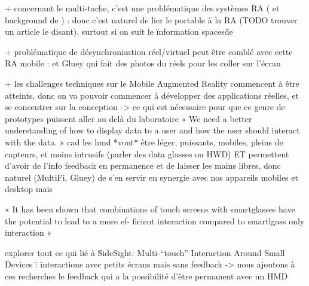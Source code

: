 + concernant le multi-tache, c'est une problématique des systèmes RA (\cite{SchmalstiegFuhrmannHesinaEtAl2002} et background de \cite{EnsFinneganIrani2014}) : donc c'est naturel de lier le portable à la RA (TODO trouver un article le disant), surtout si on suit le \"information spaces\" de \cite{EnsHincapie-RamosIrani2014}
\cite{TanCzerwinski2003}

+ problématique de désynchronisation réel/virtuel peut être comblé avec cette RA mobile : \cite{Chalon2004} et Gluey qui fait des photos du réels pour les coller sur l'écran

+ les challenges techniques sur le Mobile Augmented Reality commencent à être atteints, donc on va pouvoir commencer à développer des applications réelles, et se concentrer sur la conception -> ce qui est nécessaire pour que ce genre de prototypes puissent aller au delà du laboratoire
« We need a better understanding of how to display data
to a user and how the user should interact with the data. » \cite{AzumaBaillotBehringerEtAl2001}
cad les hmd *vont* être léger, puissants, mobiles, pleins de capteurs, et moins intrusifs (parler des data glasses ou HWD) ET permettent d'avoir de l'info feedback en permanence et de laisser les mains libres, donc naturel (MultiFi, Gluey) de s'en servir en synergie avec nos appareils mobiles et desktop
mais

« It has been shown that combinations of touch screens
with smartglasses have the potential to lead to a more ef-
ficient interaction compared to smartlgass only interaction » \cite{GrubertHeinischQuigleyEtAl2015}

explorer tout ce qui lié à \"SideSight: Multi-“touch” Interaction Around Small Devices \" : interactions avec petits écrans mais sans feedback -> nous ajoutons à ces recherches le feedback qui a la possibilité d'être permanent avec un HMD

